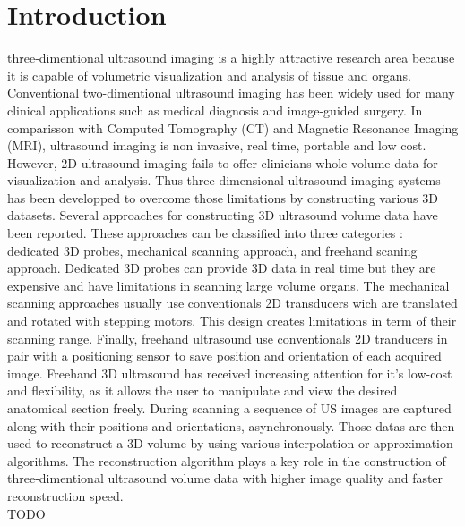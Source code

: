 \documentclass[12pt,journal,compsoc]{IEEEtran}
\begin{document}
\maketitle

\section{Introduction}

 three-dimentional ultrasound imaging is a highly attractive research area because it is capable of volumetric visualization and analysis of tissue and organs. Conventional two-dimentional ultrasound imaging has been widely used for many clinical applications such as medical diagnosis and image-guided surgery. In comparisson with Computed Tomography (CT) and Magnetic Resonance Imaging (MRI), ultrasound imaging is non invasive, real time, portable and low cost. However, 2D ultrasound imaging fails to offer clinicians whole volume data for visualization and analysis. Thus three-dimensional ultrasound imaging systems has been developped to overcome those limitations by constructing various 3D datasets. Several approaches for constructing 3D ultrasound volume data have been reported. These approaches can be classified into three categories : dedicated 3D probes, mechanical scanning approach, and freehand scaning approach. 
Dedicated 3D probes can provide 3D data in real time but they are expensive and have limitations in scanning large volume organs.
The mechanical scanning approaches usually use conventionals 2D transducers wich are translated and rotated with stepping motors. This design creates limitations in term of their scanning range. 
Finally, freehand ultrasound use conventionals 2D tranducers in pair with a positioning sensor to save position and orientation of each acquired image.
Freehand 3D ultrasound has received increasing attention for it's low-cost and flexibility, as it allows the user to manipulate and view the desired anatomical section freely.
During scanning a sequence of US images are captured along with their positions and orientations, asynchronously. Those datas are then used to reconstruct a 3D volume by using various interpolation or approximation algorithms. The reconstruction algorithm plays a key role in the construction of three-dimentional ultrasound volume data with higher image quality and faster reconstruction speed.\\

TODO\\
\end{document}
